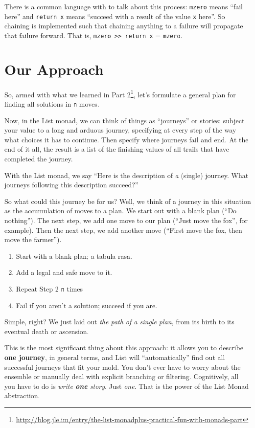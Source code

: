 \documentclass[]{article}
\renewcommand{\href}[2]{#2\footnote{\url{#1}}}
\begin{document}
There is a common language with to talk about this process: \texttt{mzero} means
``fail here'' and \texttt{return\ x} means ``succeed with a result of the value
\texttt{x} here''. So chaining is implemented such that chaining anything to a
failure will propagate that failure forward. That is,
\texttt{mzero\ \textgreater{}\textgreater{}\ return\ x} = \texttt{mzero}.

\section{Our Approach}\label{our-approach}

So, armed with what we learned in
\href{http://blog.jle.im/entry/the-list-monadplus-practical-fun-with-monads-part}{Part
2}, let's formulate a general plan for finding all solutions in \texttt{n}
moves.

Now, in the List monad, we can think of things as ``journeys'' or stories:
subject your value to a long and arduous journey, specifying at every step of
the way what choices it has to continue. Then specify where journeys fail and
end. At the end of it all, the result is a list of the finishing values of all
trails that have completed the journey.

With the List monad, we say ``Here is the description of \emph{a} (single)
journey. What journeys following this description succeed?''

So what could this journey be for us? Well, we think of a journey in this
situation as the accumulation of moves to a plan. We start out with a blank plan
(``Do nothing''). The next step, we add one move to our plan (``Just move the
fox'', for example). Then the next step, we add another move (``First move the
fox, then move the farmer'').

\begin{enumerate}
\def\labelenumi{\arabic{enumi}.}
\tightlist
\item
  Start with a blank plan; a tabula rasa.
\item
  Add a legal and safe move to it.
\item
  Repeat Step 2 \texttt{n} times
\item
  Fail if you aren't a solution; succeed if you are.
\end{enumerate}

Simple, right? We just laid out \emph{the path of a single plan}, from its birth
to its eventual death or ascension.

This is the most significant thing about this approach: it allows you to
describe \textbf{one journey}, in general terms, and List will ``automatically''
find out all successful journeys that fit your mold. You don't ever have to
worry about the ensemble or manually deal with explicit branching or filtering.
Cognitively, all you have to do is \emph{write \textbf{one} story}. Just
\emph{one}. That is the power of the List Monad abstraction.
\end{document}
